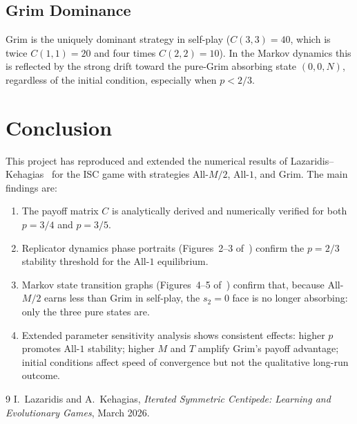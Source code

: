 \documentclass[12pt,a4paper]{article}
\begin{document}
\subsection{Grim Dominance}

Grim is the uniquely dominant strategy in self-play ($C(3,3) = 40$, which is
twice $C(1,1) = 20$ and four times $C(2,2) = 10$). In the Markov dynamics this
is reflected by the strong drift toward the pure-Grim absorbing state $(0,0,N)$,
regardless of the initial condition, especially when $p < 2/3$.

\section{Conclusion}

This project has reproduced and extended the numerical results of
Lazaridis--Kehagias~\cite{LK2026} for the ISC game with strategies All-$M/2$,
All-$1$, and Grim. The main findings are:

\begin{enumerate}
  \item The payoff matrix $C$ is analytically derived and numerically verified
        for both $p = 3/4$ and $p = 3/5$.
  \item Replicator dynamics phase portraits (Figures~2--3 of~\cite{LK2026})
        confirm the $p = 2/3$ stability threshold for the All-$1$ equilibrium.
  \item Markov state transition graphs (Figures~4--5 of~\cite{LK2026}) confirm
        that, because All-$M/2$ earns less than Grim in self-play, the $s_2=0$
        face is no longer absorbing: only the three pure states are.
  \item Extended parameter sensitivity analysis shows consistent effects:
        higher $p$ promotes All-$1$ stability; higher $M$ and $T$ amplify
        Grim's payoff advantage; initial conditions affect speed of convergence
        but not the qualitative long-run outcome.
\end{enumerate}

\begin{thebibliography}{9}
  I.~Lazaridis and A.~Kehagias,
  \textit{Iterated Symmetric Centipede: Learning and Evolutionary Games},
  March 2026.
\end{thebibliography}
\end{document}

